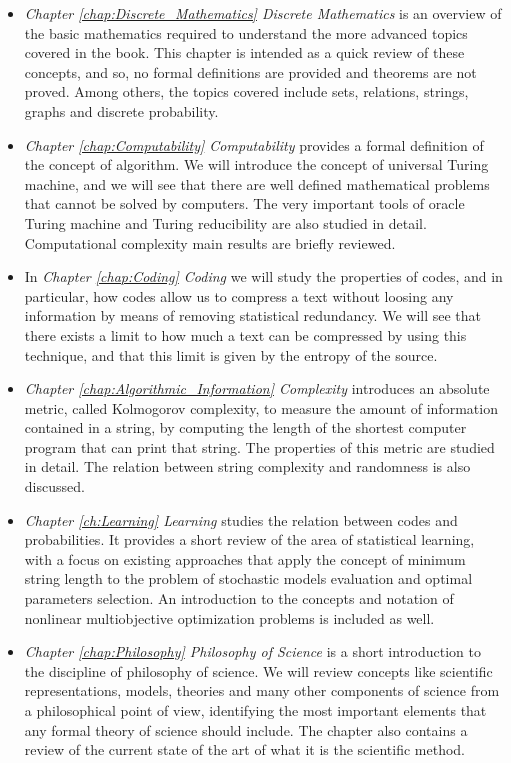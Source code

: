 \begin{itemize}

\item \emph{Chapter \ref{chap:Discrete_Mathematics} Discrete Mathematics} is an overview of the basic mathematics required to understand the more advanced topics covered in the book. This chapter is intended as a quick review of these concepts, and so, no formal definitions are provided and theorems are not proved. Among others, the topics covered include sets, relations, strings, graphs and discrete probability.

\item \emph{Chapter \ref{chap:Computability} Computability} provides a formal definition of the concept of algorithm. We will introduce the concept of universal Turing machine, and we will see that there are well defined mathematical problems that cannot be solved by computers. The very important tools of oracle Turing machine and Turing reducibility are also studied in detail. Computational complexity main results are briefly reviewed.

\item In \emph{Chapter \ref{chap:Coding} Coding} we will study the properties of codes, and in particular, how codes allow us to compress a text without loosing any information by means of removing statistical redundancy. We will see that there exists a limit to how much a text can be compressed by using this technique, and that this limit is given by the entropy of the source.

\item \emph{Chapter \ref{chap:Algorithmic_Information} Complexity} introduces an absolute metric, called Kolmogorov complexity, to measure the amount of information contained in a string, by computing the length of the shortest computer program that can print that string. The properties of this metric are studied in detail. The relation between string complexity and randomness is also discussed.

\item \emph{Chapter \ref{ch:Learning} Learning} studies the relation between codes and probabilities. It provides a short review of the area of statistical learning, with a focus on existing approaches that apply the concept of minimum string length to the problem of stochastic models evaluation and optimal parameters selection. An introduction to the concepts and notation of nonlinear multiobjective optimization problems is included as well. 

\item \emph{Chapter \ref{chap:Philosophy} Philosophy of Science} is a short introduction to the discipline of philosophy of science. We will review concepts like scientific representations, models, theories and many other components of science from a philosophical point of view, identifying the most important elements that any formal theory of science should include. The chapter also contains a review of the current state of the art of what it is the scientific method.

\end{itemize}

